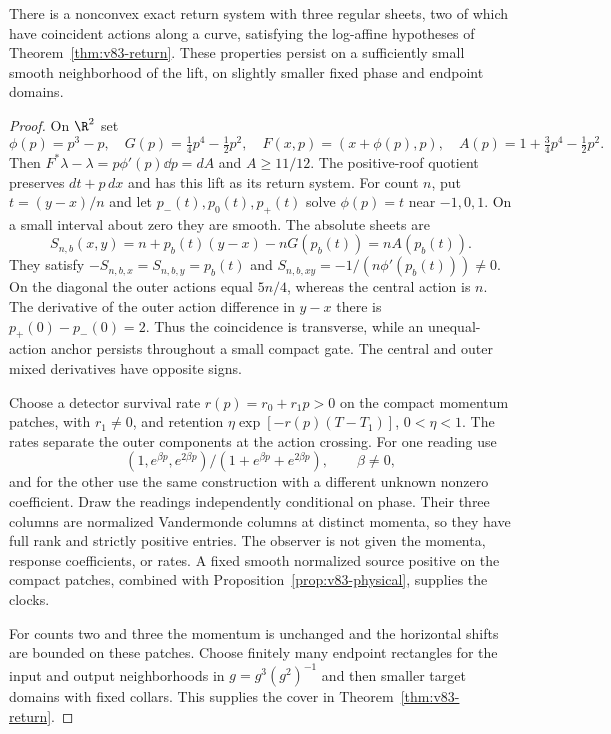 \begin{proposition}
\label{prop:v83-shear}
There is a nonconvex exact return system with three regular sheets,
two of which have coincident actions along a curve, satisfying the
log-affine hypotheses of Theorem~\ref{thm:v83-return}. These properties
persist on a sufficiently small smooth neighborhood of the lift,
on slightly smaller fixed phase and endpoint domains.
\end{proposition}
\begin{proof}
On $\R^2$ set
\[
 \phi(p)=p^3-p,\quad G(p)=\tfrac14p^4-\tfrac12p^2,\quad
 F(x,p)=(x+\phi(p),p),\quad A(p)=1+\tfrac34p^4-\tfrac12p^2.
\]
Then $F^*\lambda-\lambda=p\phi'(p)\dd p=dA$ and
$A\ge11/12$. The positive-roof quotient preserves $dt+p\,dx$
and has this lift as its return system. For count $n$, put
$t=(y-x)/n$ and let $p_-(t),p_0(t),p_+(t)$ solve $\phi(p)=t$
near $-1,0,1$. On a small interval about zero they are smooth. The
absolute sheets are
\[
 S_{n,b}(x,y)=n+p_b(t)(y-x)-nG(p_b(t))=nA(p_b(t)).
\]
They satisfy $-S_{n,b,x}=S_{n,b,y}=p_b(t)$ and
$S_{n,b,xy}=-1/(n\phi'(p_b(t)))\ne0$.
On the diagonal the outer actions equal $5n/4$, whereas the central
action is $n$. The derivative of the outer action difference in
$y-x$ there is $p_+(0)-p_-(0)=2$. Thus the coincidence is transverse,
while an unequal-action anchor persists throughout a small compact gate.
The central and outer mixed derivatives have opposite signs.

Choose a detector survival rate $r(p)=r_0+r_1p>0$ on the compact
momentum patches, with $r_1\ne0$, and retention
$\eta\exp[-r(p)(T-T_1)]$, $0<\eta<1$. The rates separate the
outer components at the action crossing. For one reading use
\[
 (1,e^{\beta p},e^{2\beta p})/(1+e^{\beta p}+e^{2\beta p}),
                       \qquad \beta\ne0,
\]
and for the other use the same construction with a different unknown
nonzero coefficient. Draw the readings independently conditional on
phase. Their three columns are normalized Vandermonde columns at
distinct momenta, so they have full rank and strictly positive entries.
The observer is not given the momenta, response coefficients, or rates.
A fixed smooth normalized source positive on the compact patches,
combined with Proposition~\ref{prop:v83-physical}, supplies the clocks.

For counts two and three the momentum is unchanged and the horizontal
shifts are bounded on these patches. Choose finitely many endpoint
rectangles for the input and output neighborhoods in
$g=g^3(g^2)^{-1}$ and then smaller target domains with fixed collars.
This supplies the cover in Theorem~\ref{thm:v83-return}.


\end{proof}
